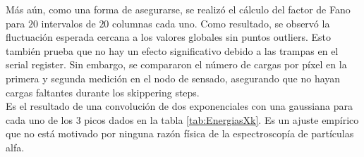 {\indent Más aún, como una forma de asegurarse, se realizó el cálculo del factor de Fano para $20$ intervalos de $20$ columnas cada uno. Como resultado, se observó la fluctuación esperada cercana a los valores globales sin puntos outliers. Esto también prueba que no hay un efecto significativo debido a las trampas en el serial register. Sin embargo, se compararon el número de cargas por píxel en la primera y segunda medición en el nodo de sensado, asegurando que no hayan cargas faltantes durante los skippering steps.\\
%
\indent Es el resultado de una convolución de dos exponenciales con una gaussiana para cada uno de los $3$ picos dados en la tabla \ref{tab:EnergiasXk}. Es un ajuste empírico que no está motivado por ninguna razón física de la espectroscopía de partículas alfa.\\
}
